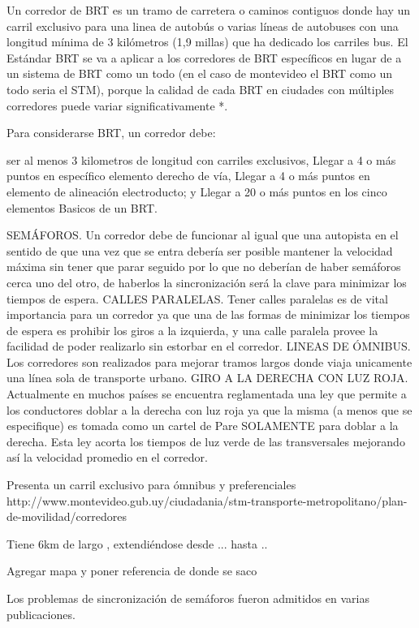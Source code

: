 Un corredor de BRT es un tramo de carretera o caminos contiguos donde hay un carril exclusivo para una linea de autobús o varias líneas de autobuses con una longitud mínima de 3 kilómetros (1,9 millas) que ha dedicado los carriles bus. El Estándar BRT se va a aplicar a los corredores de BRT específicos en lugar de a un sistema de BRT como un todo (en el caso de montevideo el BRT como un todo seria el STM), porque la calidad de cada BRT en ciudades con múltiples corredores puede variar significativamente *.

Para considerarse BRT, un corredor debe:

ser al menos 3 kilometros de longitud con carriles exclusivos,
Llegar a  4 o más puntos en específico elemento derecho de vía,
Llegar a 4 o más puntos en elemento de alineación electroducto; y
Llegar a 20 o más puntos en los cinco elementos Basicos de un BRT.


SEMÁFOROS. Un corredor debe de funcionar al igual que una autopista en el sentido de que una vez que se entra debería ser posible mantener la velocidad máxima sin tener que parar seguido por lo que no deberían de haber semáforos cerca uno del otro, de haberlos la sincronización será la clave para minimizar los tiempos de espera.
CALLES PARALELAS. Tener calles paralelas es de vital importancia para un corredor ya que una de las formas de minimizar los tiempos de espera es prohibir los giros a la izquierda, y una calle paralela provee la facilidad de poder realizarlo sin estorbar en el corredor.
LINEAS DE ÓMNIBUS. Los corredores son realizados para mejorar tramos largos donde viaja unicamente una línea sola de transporte urbano.
GIRO A LA DERECHA CON LUZ ROJA. Actualmente en muchos países se encuentra reglamentada una ley que permite a los conductores doblar a la derecha con luz roja ya que la misma (a menos que se especifique) es tomada como un cartel de Pare SOLAMENTE para doblar a la derecha. Esta ley acorta los tiempos de luz verde de las transversales mejorando así la velocidad promedio en el corredor.

Presenta un carril exclusivo para ómnibus y preferenciales
http://www.montevideo.gub.uy/ciudadania/stm-transporte-metropolitano/plan-de-movilidad/corredores

Tiene 6km de largo , extendiéndose desde ...  hasta ..

Agregar mapa y poner referencia de donde se saco

Los problemas de sincronización de semáforos fueron admitidos en varias publicaciones.

